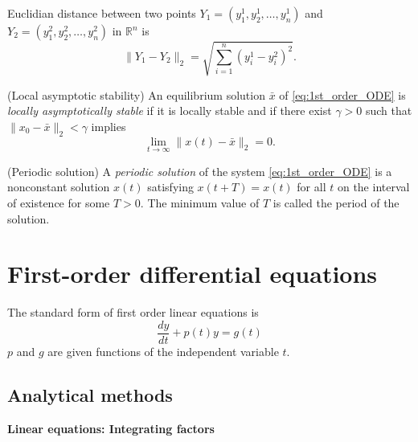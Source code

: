 Euclidian distance between two points $Y_1=(y_1^1,y_2^1,\dots,y_n^1)$ and $Y_2=(y_1^2,y_2^2,\dots,y_n^2)$ in $\mathbb{R}^n$ is $$\|Y_1-Y_2\|_2=\sqrt{\sum _{i=1}^n(y_i^1-y_i^2)^2}.$$

\begin{definition}(Local asymptotic stability) 
An equilibrium solution $\bar x$ of \eqref{eq:1st_order_ODE} is \emph{locally asymptotically stable} if it is locally stable and if there exist $\gamma >0$ such that $\| x_0-\bar x\| _2< \gamma$ implies
$$\lim_{t\rightarrow \infty}\| x(t)-\bar x\| _2=0.$$
\end{definition}


\begin{definition}(Periodic solution)
A \emph{periodic solution} of the system \eqref{eq:1st_order_ODE} is a nonconstant solution $x(t)$ satisfying $x(t+T)=x(t)$ for all $t$ on the interval of existence  for some $T>0$. The minimum value of $T$ is called the period of the solution.
\end{definition}

\section{First-order differential equations}
\begin{definition}
The standard form of first order linear
equations is
$$\frac{dy}{dt}+p(t)y=g(t)$$
$p$ and $g$ are given functions of the independent variable $t$.
\end{definition}


\subsection{Analytical methods}


{\bf Linear equations: Integrating factors}



